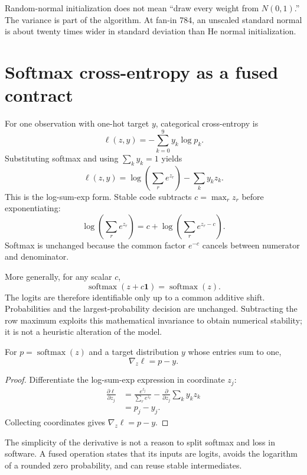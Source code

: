 \begin{warningbox}
Random-normal initialization does not mean ``draw every weight from
$N(0,1)$.'' The variance is part of the algorithm. At fan-in 784, an unscaled
standard normal is about twenty times wider in standard deviation than He
normal initialization.
\end{warningbox}

\section{Softmax cross-entropy as a fused contract}

For one observation with one-hot target $y$, categorical cross-entropy is
\[
  \ell(z,y)=-\sum_{k=0}^{9}y_k\log p_k.
\]
Substituting softmax and using $\sum_k y_k=1$ yields
\[
  \ell(z,y)
  =\log\left(\sum_r e^{z_r}\right)-\sum_k y_kz_k.
\]
This is the log-sum-exp form. Stable code subtracts
$c=\max_r z_r$ before exponentiating:
\[
  \log\left(\sum_r e^{z_r}\right)
  =c+\log\left(\sum_r e^{z_r-c}\right).
\]
Softmax is unchanged because the common factor $e^{-c}$ cancels between
numerator and denominator.

More generally, for any scalar $c$,
\[
  \operatorname{softmax}(z+c\mathbf1)=\operatorname{softmax}(z).
\]
The logits are therefore identifiable only up to a common additive shift.
Probabilities and the largest-probability decision are unchanged. Subtracting
the row maximum exploits this mathematical invariance to obtain numerical
stability; it is not a heuristic alteration of the model.

\begin{proposition}
For $p=\operatorname{softmax}(z)$ and a target distribution $y$ whose entries
sum to one,
\[
  \nabla_z\ell=p-y.
\]
\end{proposition}

\begin{proof}
Differentiate the log-sum-exp expression in coordinate $z_j$:
\[
\begin{aligned}
\frac{\partial\ell}{\partial z_j}
&=\frac{e^{z_j}}{\sum_r e^{z_r}}
  -\frac{\partial}{\partial z_j}\sum_k y_kz_k\\
&=p_j-y_j.
\end{aligned}
\]
Collecting coordinates gives $\nabla_z\ell=p-y$.
\end{proof}

The simplicity of the derivative is not a reason to split softmax and loss in
software. A fused operation states that its inputs are logits, avoids the
logarithm of a rounded zero probability, and can reuse stable intermediates.

